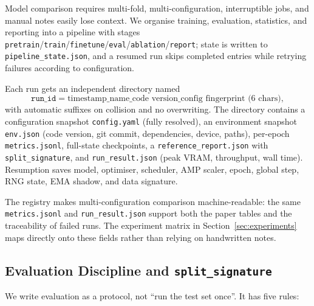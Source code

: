 Model comparison requires multi-fold, multi-configuration, interruptible jobs, and manual notes easily lose context. We organise training, evaluation, statistics, and reporting into a pipeline with stages \texttt{pretrain}/\texttt{train}/\texttt{finetune}/\texttt{eval}/\texttt{ablation}/\texttt{report}; state is written to \texttt{pipeline\_state.json}, and a resumed run skips completed entries while retrying failures according to configuration.

Each run gets an independent directory named
\begin{equation}
\texttt{run\_id}=\text{timestamp}\_\text{name}\_\text{code version}\_\text{config fingerprint (6 chars)},
\end{equation}
with automatic suffixes on collision and no overwriting. The directory contains a configuration snapshot \texttt{config.yaml} (fully resolved), an environment snapshot \texttt{env.json} (code version, git commit, dependencies, device, paths), per-epoch \texttt{metrics.jsonl}, full-state checkpoints, a \texttt{reference\_report.json} with \texttt{split\_signature}, and \texttt{run\_result.json} (peak VRAM, throughput, wall time). Resumption saves model, optimiser, scheduler, AMP scaler, epoch, global step, RNG state, EMA shadow, and data signature.

The registry makes multi-configuration comparison machine-readable: the same \texttt{metrics.jsonl} and \texttt{run\_result.json} support both the paper tables and the traceability of failed runs. The experiment matrix in Section~\ref{sec:experiments} maps directly onto these fields rather than relying on handwritten notes.



\subsection{Evaluation Discipline and \texttt{split\_signature}}\label{sec:discipline}

We write evaluation as a protocol, not ``run the test set once''. It has five rules:

